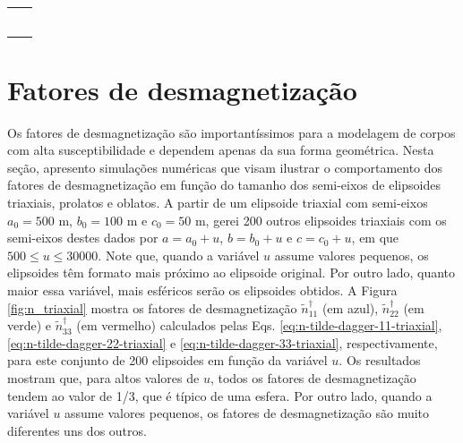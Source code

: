 \begin{table}[h!]
	\begin{center}
		\begin{tabular}{lc}
			
			& \\
			& \\
			& \\
			& \\
			& \\
			& \\

		\end{tabular}
	\end{center}
\end{table}

\section{Fatores de desmagnetização}

Os fatores de desmagnetização são importantíssimos para a modelagem de corpos com alta susceptibilidade e dependem apenas da sua forma geométrica. 
Nesta seção, apresento simulações numéricas que visam ilustrar o comportamento dos fatores de desmagnetização em função do tamanho dos semi-eixos de elipsoides triaxiais, prolatos e oblatos. A partir de um elipsoide triaxial com semi-eixos $a_0=500$ m, $b_0=100$ m e $c_0=50$ m, gerei 200 outros elipsoides triaxiais com os semi-eixos destes dados por $a=a_0+u$, $b=b_0+u$ e $c=c_0+u$, em que $500 \le u \le 30000$. Note que, quando a variável $u$ assume valores pequenos, os elipsoides têm formato mais próximo ao elipsoide original. Por outro lado, quanto maior essa variável, mais esféricos serão os elipsoides obtidos. A Figura \ref{fig:n_triaxial} mostra os fatores de desmagnetização $\tilde{n}^{\dagger}_{11}$ (em azul), $\tilde{n}^{\dagger}_{22}$ (em verde) e $\tilde{n}^{\dagger}_{33}$ (em vermelho) calculados pelas Eqs. \ref{eq:n-tilde-dagger-11-triaxial}, \ref{eq:n-tilde-dagger-22-triaxial} e \ref{eq:n-tilde-dagger-33-triaxial}, respectivamente, para este conjunto de 200 elipsoides em função da variável $u$. Os resultados mostram que, para altos valores de $u$, todos os fatores de desmagnetização tendem ao valor de 1/3, que é típico de uma esfera. Por outro lado, quando a variável $u$ assume valores pequenos, os fatores de desmagnetização são muito diferentes uns dos outros.

